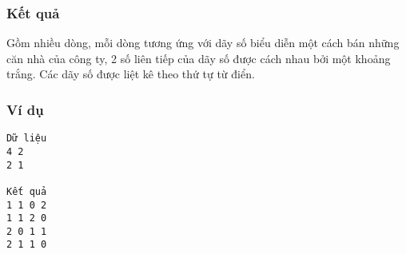 \subsubsection{   Kết quả  }

   Gồm nhiều dòng, mỗi dòng tương ứng với dãy số biểu diễn một cách bán những căn nhà của công ty, 2 số liên tiếp của dãy số được cách nhau bởi một khoảng trắng. Các dãy số được liệt kê theo thứ tự từ điển.  

\subsubsection{   Ví dụ  }
\begin{verbatim}
Dữ liệu
4 2
2 1

Kết quả
1 1 0 2
1 1 2 0
2 0 1 1
2 1 1 0
\end{verbatim}